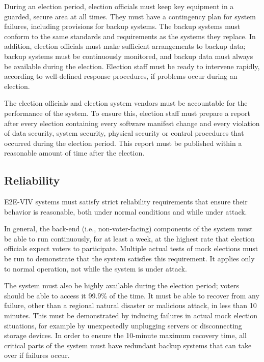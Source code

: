 During an election period, election officials must keep key equipment
in a guarded, secure area at all times. They must have a contingency
plan for system failures, including provisions for backup systems. The
backup systems must conform to the same standards and requirements as
the systems they replace. In addition, election officials must make
sufficient arrangements to backup data; backup systems must be
continuously monitored, and backup data must always be available
during the election. Election staff must be ready to intervene
rapidly, according to well-defined response procedures, if problems
occur during an election.

The election officials and election system vendors must be accountable
for the performance of the system. To ensure this, election staff must
prepare a report after every election containing every software
manifest change and every violation of data security, system security,
physical security or control procedures that occurred during the
election period. This report must be published within a reasonable
amount of time after the election.

\subsection{Reliability}

E2E-VIV systems must satisfy strict reliability requirements that
ensure their behavior is reasonable, both under normal conditions and
while under attack.

In general, the back-end (i.e., non-voter-facing) components of the
system must be able to run continuously, for at least a week, at the
highest rate that election officials expect voters to
participate. Multiple actual tests of mock elections must be run to
demonstrate that the system satisfies this requirement. It applies
only to normal operation, not while the system is under attack.

The system must also be highly available during the election period;
voters should be able to access it 99.9\% of the time. It must be able
to recover from any failure, other than a regional natural disaster or
malicious attack, in less than 10 minutes. This must be demonstrated
by inducing failures in actual mock election situations, for example
by unexpectedly unplugging servers or disconnecting storage
devices. In order to ensure the 10-minute maximum recovery time, all
critical parts of the system must have redundant backup systems that
can take over if failures occur.

